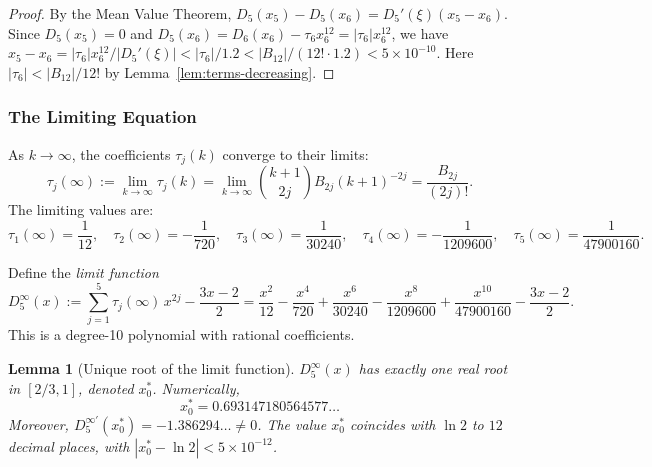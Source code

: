 \documentclass[12pt,a4paper]{article}
\theoremstyle{plain}
\newtheorem{lemma}[theorem]{Lemma}
\theoremstyle{definition}
\begin{document}
\begin{proof}
  By the Mean Value Theorem, $D_5(x_5) - D_5(x_6) = D_5'(\xi)(x_5 - x_6)$.
  Since $D_5(x_5) = 0$ and $D_5(x_6) = D_6(x_6) - \tau_6 x_6^{12}
  = |\tau_6|x_6^{12}$, we have
  $x_5 - x_6 = |\tau_6|x_6^{12} / |D_5'(\xi)|
  < |\tau_6| / 1.2 < |B_{12}|/(12! \cdot 1.2)
  < 5 \times 10^{-10}$.
  Here $|\tau_6| < |B_{12}|/12!$ by Lemma~\ref{lem:terms-decreasing}.
\end{proof}


\subsubsection{The Limiting Equation}
\label{sec:limit-eq}

As $k \to \infty$, the coefficients $\tau_j(k)$ converge to their limits:
\begin{equation}\label{eq:tau-inf-new}
  \tau_j(\infty) := \lim_{k\to\infty} \tau_j(k)
  = \lim_{k\to\infty} \binom{k+1}{2j} B_{2j} (k+1)^{-2j}
  = \frac{B_{2j}}{(2j)!}.
\end{equation}
The limiting values are:
\[
  \tau_1(\infty) = \frac{1}{12},\quad
  \tau_2(\infty) = -\frac{1}{720},\quad
  \tau_3(\infty) = \frac{1}{30240},\quad
  \tau_4(\infty) = -\frac{1}{1209600},\quad
  \tau_5(\infty) = \frac{1}{47900160}.
\]

Define the \emph{limit function}
\begin{equation}\label{eq:D5inf-new}
  D_5^\infty(x) := \sum_{j=1}^{5} \tau_j(\infty)\,x^{2j} - \frac{3x-2}{2}
  = \frac{x^2}{12} - \frac{x^4}{720} + \frac{x^6}{30240}
    - \frac{x^8}{1209600} + \frac{x^{10}}{47900160}
    - \frac{3x-2}{2}.
\end{equation}
This is a degree-10 polynomial with rational coefficients.

\begin{lemma}[Unique root of the limit function]\label{lem:D5inf-unique}
  $D_5^\infty(x)$ has exactly one real root in $[2/3, 1]$, denoted $x_0^*$.
  Numerically,
  \begin{equation}\label{eq:x0star-new}
    x_0^* = 0.693147180564577\ldots
  \end{equation}
  Moreover, $D_5^{\infty\prime}(x_0^*) = -1.386294\ldots \neq 0$.
  The value $x_0^*$ coincides with $\ln 2$ to $12$ decimal places, with
  $|x_0^* - \ln 2| < 5 \times 10^{-12}$.
\end{lemma}
\end{document}
